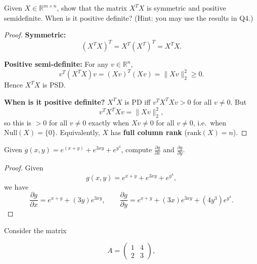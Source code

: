 \documentclass[en,hazy,blue,12pt,normal]{elegantnote}
\begin{document}
\begin{homework}
     Given $X \in \mathbb{R}^{m \times n}$, show that the matrix $X^T X$ is symmetric and positive semidefinite. When is it positive definite? (Hint: you may use the results in Q4.)
\end{homework}


\begin{proof}
\textbf{Symmetric:}
\[
(X^T X)^T = X^T (X^T)^T = X^T X.
\]

\textbf{Positive semi-definite:} For any $v\in\mathbb{R}^n$,
\[
v^T (X^T X) v = (Xv)^T (Xv) = \|Xv\|_2^2 \ge 0.
\]
Hence $X^T X$ is PSD.

\textbf{When is it positive definite?}
$X^T X$ is PD iff $v^T X^T X v > 0$ for all $v\neq 0$. But
\[
v^T X^T X v = \|Xv\|_2^2,
\]
so this is $>0$ for all $v\neq 0$ exactly when $Xv\neq 0$ for all $v\neq 0$, i.e.\ when $\mathrm{Null}(X)=\{0\}$.
Equivalently, $X$ has \textbf{full column rank} ($\mathrm{rank}(X)=n$).
\end{proof}

\begin{homework}
    Given $g(x, y)=e^{(x+y)}+e^{3 x y}+e^{y^4}$, compute $\frac{\partial g}{\partial x}$ and $\frac{\partial g}{\partial y}$.
\end{homework}

\begin{proof}
    Given
\[
g(x,y)=e^{x+y}+e^{3xy}+e^{y^4},
\]
we have
\[
\frac{\partial g}{\partial x} = e^{x+y} + (3y)e^{3xy},
\qquad
\frac{\partial g}{\partial y} = e^{x+y} + (3x)e^{3xy} + (4y^3)e^{y^4}.
\]
\end{proof}

\begin{homework}
    Consider the matrix

$$
A=\left(\begin{array}{ll}
1 & 4 \\
2 & 3
\end{array}\right),
$$
\end{homework}
\end{document}
